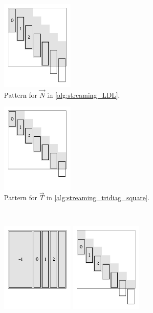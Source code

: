 \begin{figure}
    \centering
    \begin{subfigure}{.48\textwidth}\centering
    \includegraphics[height=4.5cm]{imgs/ch5_streaming_LDL.pdf}
    \caption{Pattern for $\vec{N}$ in \cref{alg:streaming_LDL}.}
    \label{fig:streaming_LDL}
    \end{subfigure}
    \hfill
    \begin{subfigure}{.48\textwidth}\centering
    \includegraphics[height=4.5cm]{imgs/ch5_streaming_tridiag_square.pdf}
    \caption{Pattern for $\vec{T}$ in \cref{alg:streaming_tridiag_square}.}
    \label{fig:streaming_tridiag_square}
    \end{subfigure}
    \\
    \begin{subfigure}{\textwidth}\centering
    \includegraphics[height=4.5cm]{imgs/ch5_streaming_binv_Q.pdf}
    \hfill   
    \includegraphics[height=4.5cm]{imgs/ch5_streaming_binv_L.pdf}

\end{subfigure}
\end{figure}
